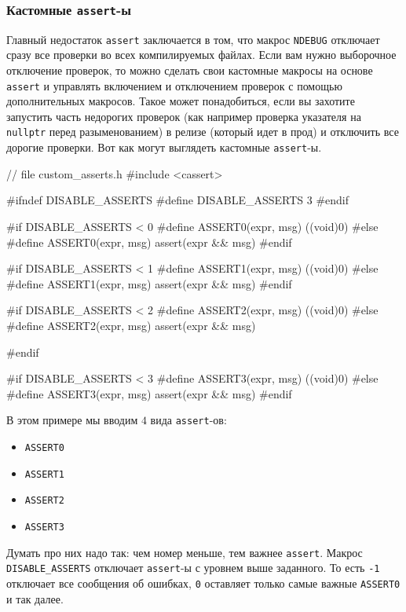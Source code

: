 \subsubsection{Кастомные \texttt{assert}-ы}

Главный недостаток \verb"assert" заключается в том, что макрос \verb"NDEBUG" отключает сразу все проверки во всех компилируемых файлах.
Если вам нужно выборочное отключение проверок, то можно сделать свои кастомные макросы на основе \verb"assert" и управлять включением и отключением проверок с помощью дополнительных макросов.
Такое может понадобиться, если вы захотите запустить часть недорогих проверок (как например проверка указателя на \verb"nullptr" перед разыменованием) в релизе (который идет в прод) и отключить все дорогие проверки.
Вот как могут выглядеть кастомные \verb"assert"-ы.
\begin{cppcode}
// file custom_asserts.h
#include <cassert>

#ifndef DISABLE_ASSERTS
#define DISABLE_ASSERTS 3
#endif

#if DISABLE_ASSERTS < 0
#define ASSERT0(expr, msg) ((void)0)
#else
#define ASSERT0(expr, msg) assert(expr && msg)
#endif

#if DISABLE_ASSERTS < 1
#define ASSERT1(expr, msg) ((void)0)
#else
#define ASSERT1(expr, msg) assert(expr && msg)
#endif

#if DISABLE_ASSERTS < 2
#define ASSERT2(expr, msg) ((void)0)
#else
#define ASSERT2(expr, msg) assert(expr && msg)

#endif

#if DISABLE_ASSERTS < 3
#define ASSERT3(expr, msg) ((void)0)
#else
#define ASSERT3(expr, msg) assert(expr && msg)
#endif
\end{cppcode}
В этом примере мы вводим $4$ вида \verb"assert"-ов:
\begin{multicols}{4}
\begin{itemize}
\item \verb"ASSERT0"

\item \verb"ASSERT1"

\item \verb"ASSERT2"

\item \verb"ASSERT3"
\end{itemize}
\end{multicols}
Думать про них надо так: чем номер меньше, тем важнее \verb"assert".
Макрос \verb"DISABLE_ASSERTS" отключает \verb"assert"-ы с уровнем выше заданного.
То есть \verb"-1" отключает все сообщения об ошибках, \verb"0" оставляет только самые важные \verb"ASSERT0" и так далее.
